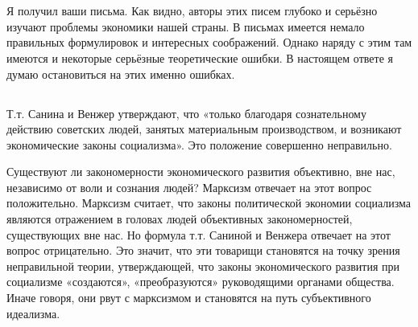 \documentclass[12pt, a4paper, openany]{book}
\begin{document}
\ \\



\ \\



\ \\



\ \\



\ \\



\section[ОТВЕТ ТОВАРИЩАМ САНИНОЙ А.В. и ВЕНЖЕРУ В.Г.]{}



Я получил ваши письма. Как видно, авторы этих писем глубоко и серьёзно изучают проблемы экономики нашей страны. В письмах имеется немало правильных формулировок и интересных соображений. Однако наряду с этим там имеются и некоторые серьёзные теоретические ошибки. В настоящем ответе я думаю остановиться на этих именно ошибках.



\vspace{0.4cm}



\subsection[1. Вопрос о характере экономических законов социализма]{}



Т.т. Санина и Венжер утверждают, что «только благодаря сознательному действию советских людей, занятых материальным производством, и возникают экономические законы социализма». Это положение совершенно неправильно.



Существуют ли закономерности экономического развития объективно, вне нас, независимо от воли и сознания людей? Марксизм отвечает на этот вопрос положительно. Марксизм считает, что законы политической экономии социализма являются отражением в головах людей объективных закономерностей, существующих вне нас. Но формула т.т. Саниной и Венжера отвечает на этот вопрос отрицательно. Это значит, что эти товарищи становятся на точку зрения неправильной теории, утверждающей, что законы экономического развития при социализме «создаются», «преобразуются» руководящими органами общества. Иначе говоря, они рвут с марксизмом и становятся на путь субъективного идеализма.
\end{document}
